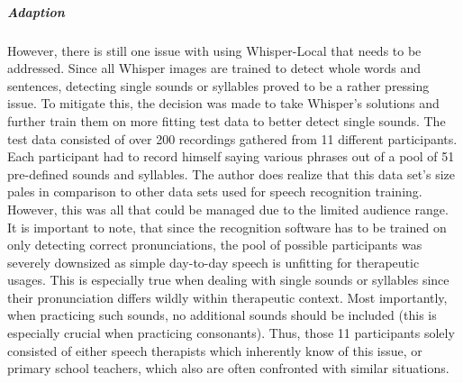 \documentclass[draft,final]{vutinfth} %
\begin{document}
\subparagraph{Adaption}
However, there is still one issue with using Whisper-Local that needs to be addressed. Since all Whisper images are trained to detect whole words and sentences, detecting single sounds or syllables proved to be a rather pressing issue. To mitigate this, the decision was made to take Whisper's solutions and further train them on more fitting test data to better detect single sounds. The test data consisted of over 200 recordings gathered from 11 different participants. Each participant had to record himself saying various phrases out of a pool of 51 pre-defined sounds and syllables.
The author does realize that this data set's size pales in comparison to other data sets used for speech recognition training. However, this was all that could be managed due to the limited audience range. It is important to note, that since the recognition  software has to be trained on only detecting correct pronunciations, the pool of possible participants was severely downsized as simple day-to-day speech is unfitting for therapeutic usages. This is especially true when dealing with single sounds or syllables since their pronunciation differs wildly within therapeutic context. Most importantly, when practicing such sounds, no additional sounds should be included (this is especially crucial when practicing consonants). Thus, those 11 participants solely consisted of either speech therapists which inherently know of this issue, or primary school teachers, which also are often confronted with similar situations.
\end{document}
